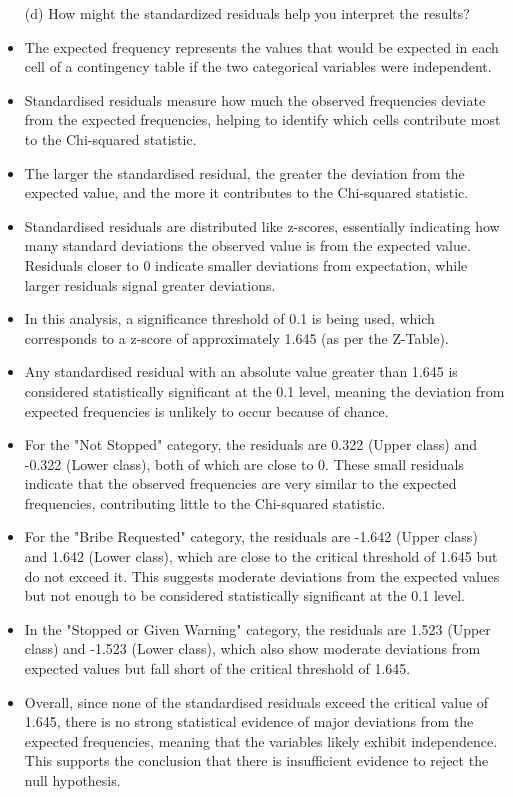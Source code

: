 \documentclass[12pt,letterpaper]{article}
\begin{document}
\newpage
\begin{enumerate}
	\item [(d)] How might the standardized residuals help you interpret the results?  	
\end{enumerate}

\begin{itemize}
	\item 
	The expected frequency represents the values that would be expected in each cell of a contingency table if the two categorical variables were independent. 
	\item
	Standardised residuals measure how much the observed frequencies deviate from the expected frequencies, helping to identify which cells contribute most to the Chi-squared statistic.
	\item 
	The larger the standardised residual, the greater the deviation from the expected value, and the more it contributes to the Chi-squared statistic.
	\item 
	Standardised residuals are distributed like z-scores, essentially indicating how many standard deviations the observed value is from the expected value. Residuals closer to 0 indicate smaller deviations from expectation, while larger residuals signal greater deviations.
	\item 
	In this analysis, a significance threshold of 0.1 is being used, which corresponds to a z-score of approximately 1.645 (as per the Z-Table). 
	\item 
	Any standardised residual with an absolute value greater than 1.645 is considered statistically significant at the 0.1 level, meaning the deviation from expected frequencies is unlikely to occur because of chance.
	\item 
	For the "Not Stopped" category, the residuals are 0.322 (Upper class) and -0.322 (Lower class), both of which are close to 0. These small residuals indicate that the observed frequencies are very similar to the expected frequencies, contributing little to the Chi-squared statistic.
	\item 
	For the "Bribe Requested" category, the residuals are -1.642 (Upper class) and 1.642 (Lower class), which are close to the critical threshold of 1.645 but do not exceed it. This suggests moderate deviations from the expected values but not enough to be considered statistically significant at the 0.1 level.
	\item 
	In the "Stopped or Given Warning" category, the residuals are 1.523 (Upper class) and -1.523 (Lower class), which also show moderate deviations from expected values but fall short of the critical threshold of 1.645.
	\item 
	Overall, since none of the standardised residuals exceed the critical value of 1.645, there is no strong statistical evidence of major deviations from the expected frequencies, meaning that the variables likely exhibit independence. This supports the conclusion that there is insufficient evidence to reject the null hypothesis.
\end{itemize}
\end{document}
